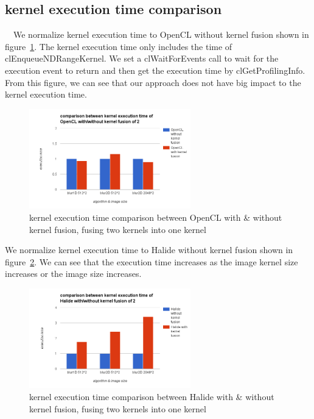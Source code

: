 \documentclass{sigplanconf}
\begin{document}
\subsection{kernel execution time comparison}
\quad\ \ We normalize kernel execution time to OpenCL without kernel fusion shown in figure~\ref{fig:my_label_ex_3}. The kernel execution time only includes the time of clEnqueueNDRangeKernel. We set a clWaitForEvents call to wait for the execution event to return and then get the execution time by clGetProfilingInfo. From this figure, we can see that our approach does not have big impact to the kernel execution time.
    
\begin{figure}[hbtp]
\centering
\includegraphics[width=7cm]{img/OpenCL-with-without-execute-2ker.png}
\caption{kernel execution time comparison between OpenCL with \& without kernel fusion, fusing two kernels into one kernel}
\label{fig:my_label_ex_3}
\end{figure}

    We normalize kernel execution time to Halide without kernel fusion shown in figure~\ref{fig:my_label_ex_4}. We can see that the execution time increases as the image kernel size increases or the image size increases.

\begin{figure}[hbtp]
\centering
\includegraphics[width=7cm]{img/Halide-with-without-execute-2ker.png}
\caption{kernel execution time comparison between Halide with \& without kernel fusion, fusing two kernels into one kernel}
\label{fig:my_label_ex_4}
\end{figure}
\end{document}
